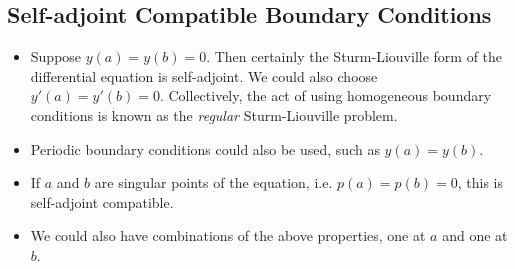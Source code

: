 \subsection{Self-adjoint Compatible Boundary Conditions}
\begin{itemize}
    \item Suppose \( y(a) = y(b) = 0 \).
    Then certainly the Sturm-Liouville form of the differential equation is self-adjoint.
    We could also choose \( y'(a) = y'(b) = 0 \).
    Collectively, the act of using homogeneous boundary conditions is known as the \textit{regular} Sturm-Liouville problem.
    \item Periodic boundary conditions could also be used, such as \( y(a) = y(b) \).
    \item If \( a \) and \( b \) are singular points of the equation, i.e. \( p(a) = p(b) = 0 \), this is self-adjoint compatible.
    \item We could also have combinations of the above properties, one at \( a \) and one at \( b \).
\end{itemize}

